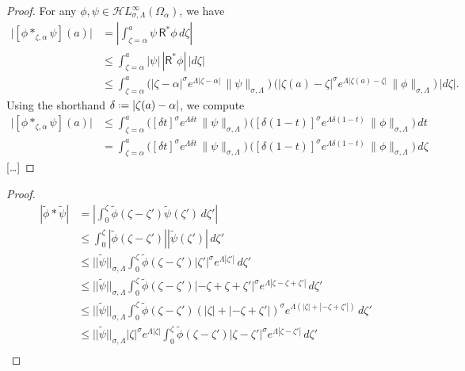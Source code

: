 \documentclass{article}
\newcommand{\singexp}[2]{\mathcal{H}L^\infty_{#1, #2}}
\newcommand{\series}[1]{\tilde{#1}}
\newcommand*{\defeq}{\mathrel{\vcenter{\baselineskip0.5ex \lineskiplimit0pt
                     \hbox{\scriptsize.}\hbox{\scriptsize.}}}%
                     =}
\theoremstyle{definition}
\theoremstyle{plain}
\newenvironment{verify}{\color{ForestGreen}}{\color{black}}
\newenvironment{todo}{\color{Coral}}{\color{black}}
\newenvironment{old}{\color{RoyalBlue}}{\color{black}}
\begin{document}
\begin{old}
\begin{proof}
For any $\phi, \psi \in \singexp{\sigma}{\Lambda}(\Omega_\alpha)$, we have
\begin{align*}
\big| [\phi \ast_{\zeta, \alpha} \psi](a) \big| & = \left| \int_{\zeta = \alpha}^a \psi\,\mathsf{R}^*\phi\,d\zeta \right| \\
& \le \int_{\zeta = \alpha}^a |\psi|\,|\mathsf{R}^*\phi|\,|d\zeta| \\
& \le \int_{\zeta = \alpha}^a \Big( |\zeta - \alpha|^\sigma e^{\Lambda|\zeta - \alpha|}\,\|\psi\|_{\sigma, \Lambda} \Big)\,\Big( |\zeta(a) - \zeta|^\sigma e^{\Lambda|\zeta(a) - \zeta|}\,\|\phi\|_{\sigma, \Lambda} \Big)\,|d\zeta|.
\end{align*}
Using the shorthand $\delta \defeq |\zeta(a) - \alpha|$, we compute
\begin{align*}
\big| [\phi \ast_{\zeta, \alpha} \psi](a) \big| & \le \int_{\zeta = \alpha}^a \Big( [\delta t]^\sigma e^{\Lambda\delta t}\,\|\psi\|_{\sigma, \Lambda} \Big)\,\Big( [\delta(1-t)]^\sigma e^{\Lambda\delta(1-t)}\,\|\phi\|_{\sigma, \Lambda} \Big)\,dt \\
& = \int_{\zeta = \alpha}^a \Big( [\delta t]^\sigma e^{\Lambda\delta t}\,\|\psi\|_{\sigma, \Lambda} \Big)\,\Big( [\delta(1-t)]^\sigma e^{\Lambda\delta(1-t)}\,\|\phi\|_{\sigma, \Lambda} \Big)\,d\zeta
\end{align*}
\begin{todo}[\ldots]\end{todo}
\end{proof}
\begin{verify}
\begin{proof}
    \begin{align*}
    |\series{\phi}\ast\series{\psi}|&=\left|\int_0^\zeta\series{\phi}(\zeta-\zeta')\series{\psi}(\zeta')\, d\zeta'\right|\\
        &\le \int_0^\zeta |\series{\phi}(\zeta-\zeta')||\series{\psi}(\zeta')|\, d\zeta'\\
        &\le ||\series{\psi}||_{\sigma,\Lambda} \int_0^\zeta\series{\phi}(\zeta-\zeta')|\zeta'|^{\sigma}e^{\Lambda|\zeta'|}\, d\zeta'\\
        &\le ||\series{\psi}||_{\sigma,\Lambda}  \int_0^\zeta\series{\phi}(\zeta-\zeta')|-\zeta+\zeta+\zeta'|^{\sigma}e^{\Lambda|\zeta-\zeta+\zeta'|}\, d\zeta'\\
        &\le ||\series{\psi}||_{\sigma,\Lambda}  \int_0^\zeta\series{\phi}(\zeta-\zeta')(|\zeta|+|-\zeta+\zeta'|)^{\sigma}e^{\Lambda(|\zeta|+|-\zeta+\zeta'|)}\, d\zeta'\\
        &\le ||\series{\psi}||_{\sigma,\Lambda} |\zeta|^{\sigma}e^{\Lambda|\zeta|} \int_0^\zeta\series{\phi}(\zeta-\zeta')|\zeta-\zeta'|^{\sigma}e^{\Lambda|\zeta-\zeta'|}\, d\zeta'\\

\end{align*}
\end{proof}
\end{verify}
\end{old}
\end{document}
